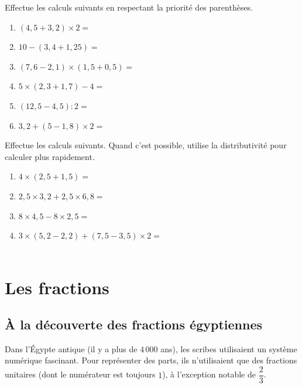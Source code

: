 \documentclass[../../syllabus_1.tex]{subfiles}
\begin{document}
\begin{itemize}
\newpage
\begin{exercise}
    Effectue les calculs suivants en respectant la priorité des parenthèses.
    \begin{enumerate}[cols=2, itemsep=1.5cm]
        \item $\left(4{,}5 + 3{,}2\right) \times 2 = $
        \item $10 - \left(3{,}4 + 1{,}25\right) = $
        \item $\left(7{,}6 - 2{,}1\right) \times \left(1{,}5 + 0{,}5\right) = $
        \item $5 \times \left(2{,}3 + 1{,}7\right) - 4 = $
        \item $\left(12{,}5 - 4{,}5\right) : 2 = $
        \item $3{,}2 + \left(5 - 1{,}8\right) \times 2 = $
    \end{enumerate}
    \vspace{1cm}
\end{exercise}

\begin{exercise}
    Effectue les calculs suivants. Quand c'est possible, utilise la distributivité pour calculer plus rapidement.
    \begin{enumerate}[cols=1, itemsep=2cm]
        \item $4 \times \left(2{,}5 + 1{,}5\right) = $ \\
        \item $2{,}5 \times 3{,}2 + 2{,}5 \times 6{,}8 = $ \\ 
        \item $8 \times 4{,}5 - 8 \times 2{,}5 = $ \\
        \item $3 \times \left(5{,}2 - 2{,}2\right) + \left(7{,}5 - 3{,}5\right) \times 2 = $ \\
        \\
    \end{enumerate}
\end{exercise}

\newpage
\section{Les fractions}
\subsection{À la découverte des fractions égyptiennes}
 
Dans l'Égypte antique (il y a plus de $4\,000$ ans), les scribes utilisaient un système numérique fascinant. Pour représenter des parts, ils n'utilisaient que des fractions unitaires (dont le numérateur est toujours $1$), à l'exception notable de $\dfrac{2}{3}$.
 

\end{itemize}
\end{document}
